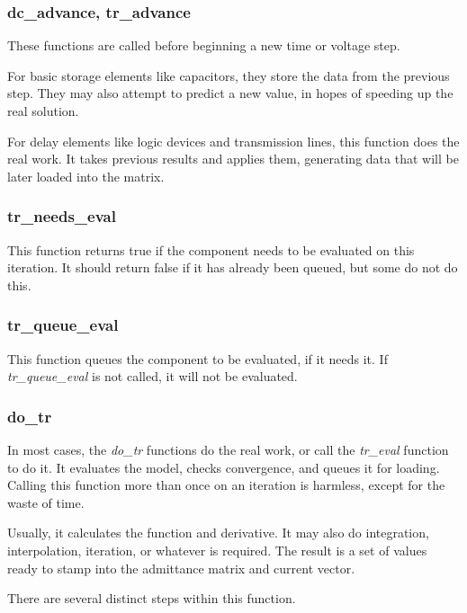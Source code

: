 \subsubsection{dc\_advance, tr\_advance}

These functions are called before beginning a new time or voltage
step.

For basic storage elements like capacitors, they store the data from
the previous step.  They may also attempt to predict a new value, in
hopes of speeding up the real solution.

For delay elements like logic devices and transmission lines, this
function does the real work.  It takes previous results and applies
them, generating data that will be later loaded into the matrix.

\subsubsection{tr\_needs\_eval}

This function returns true if the component needs to be evaluated on
this iteration.  It should return false if it has already been queued,
but some do not do this.

\subsubsection{tr\_queue\_eval}

This function queues the component to be evaluated, if it needs it.
If {\em tr\_queue\_eval} is not called, it will not be evaluated.

\subsubsection{do\_tr}

In most cases, the {\em do\_tr} functions do the real work, or call
the {\em tr\_eval} function to do it.  It evaluates the model, checks
convergence, and queues it for loading.  Calling this function more
than once on an iteration is harmless, except for the waste of time.

Usually, it calculates the function and derivative.  It may also do
integration, interpolation, iteration, or whatever is required.  The
result is a set of values ready to stamp into the admittance matrix
and current vector.

There are several distinct steps within this function.

